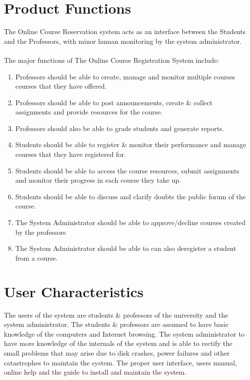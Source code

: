 \documentclass[12pt, a4]{report}
\begin{document}

\newpage
\section{Product Functions}
The Online Course Reservation system acts as an interface between the Students and the Professors, with minor human monitoring by the system administrator.
\\\\
The major functions of The Online Course Registration System include:
\begin{enumerate}
    \item Professors should be able to create, manage and monitor multiple courses courses that they have offered.
    \item Professors should be able to post announcements, create \& collect assignments and provide resources for the course.
    \item Professors should also be able to grade students and generate reports.
    \item Students should be able to register \& monitor their performance and manage courses that they have registered for. 
    \item Students should be able to access the course resources, submit assignments and monitor their progress in each course they take up.
    \item Students should be able to discuss and clarify doubts the public forum of the course.
    \item The System Administrator should be able to approve/decline courses created by the professors \item The System Administrator should be able to can also deregister a student from a course.
\end{enumerate}


\section{User Characteristics}
The users of the system are students \& professors of the university and the system administrator.
The students \& professors are assumed to have basic knowledge of the computers and Internet browsing.
The system administrator to have more knowledge of the internals of the system and is able to rectify the small problems that may arise due to disk crashes, power failures and other catastrophes to maintain the system. The proper user interface, users manual, online help and the guide to install and maintain the system.
\end{document}
